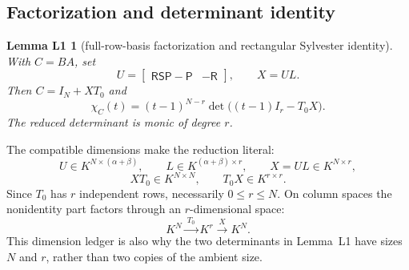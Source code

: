 \documentclass[11pt,letterpaper]{article}
\theoremstyle{plain}
\newtheorem*{lemLone}{Lemma L1}
\begin{document}
\subsection{Factorization and determinant identity}

\begin{lemLone}[full-row-basis factorization and rectangular Sylvester identity]
With $C=BA$, set
\[
U=\begin{bmatrix}\mathsf R\mathsf S\mathsf P-\mathsf P&-\mathsf R\end{bmatrix},
\qquad X=UL.
\]
Then $C=I_N+XT_0$ and
\[
\chi_C(t)=(t-1)^{N-r}\det\bigl((t-1)I_r-T_0X\bigr).
\]
The reduced determinant is monic of degree $r$.
\end{lemLone}

The compatible dimensions make the reduction literal:
\[
U\in K^{N\times(\alpha+\beta)},\qquad
L\in K^{(\alpha+\beta)\times r},\qquad
X=UL\in K^{N\times r},
\]
\[
XT_0\in K^{N\times N},\qquad
T_0X\in K^{r\times r}.
\]
Since $T_0$ has $r$ independent rows, necessarily $0\leq r\leq N$.  On column spaces the nonidentity part factors through an $r$-dimensional space:
\[
K^N\xrightarrow{\ T_0\ }K^r\xrightarrow{\ X\ }K^N.
\]
This dimension ledger is also why the two determinants in Lemma~L1 have sizes $N$ and $r$, rather than two copies of the ambient size.
\end{document}
